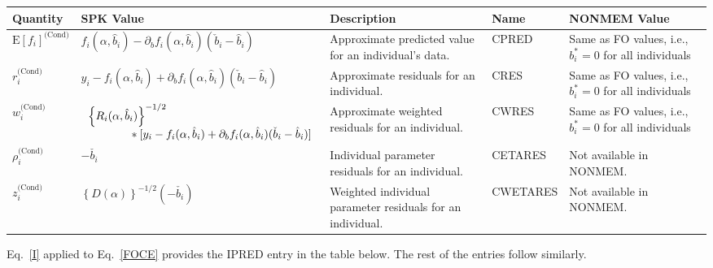 \documentclass{article}
\begin{document}
\begin{center}
\begin{tabular}{|p{0.75in}|p{3.25in}|p{1.1in}|p{0.85in}|p{1.0in}|}
\hline
\hline
  {\bf Quantity}
    & {\bf SPK Value}
    & {\bf Description}
    & {\bf Name}
    & {\bf NONMEM Value} \\
  \hline
  \hline
  $\mbox{E} \left[ f_i \right]^{\mbox{(Cond)}}$
    & $f_i(\alpha, \hat{b}_i) - \partial_b f_i(\alpha, \hat{b}_i)(\check{b}_i- \hat{b}_i)$
    & Approximate predicted value for an individual's data.
    & CPRED 
    & Same as FO values, i.e., $b^{\ast}_i = 0$ for all individuals\\
  \hline
  $r^{\mbox{(Cond)}}_i$
    & $y_i - f_i(\alpha, \hat{b}_i) + \partial_b f_i(\alpha, \hat{b}_i)(\check{b}_i- \hat{b}_i)$
    & Approximate residuals for an individual.
    & CRES 
    & Same as FO values, i.e., $b^{\ast}_i = 0$ for all individuals\\
  \hline
  $w^{\mbox{(Cond)}}_i$
    & $\begin{array}{l}
        \left\{ R_i(\alpha, \hat{b}_i) \right\}^{-1/2} \\
        \mbox{\hspace{0.5in}}
        \ast [ y_i - f_i(\alpha, \hat{b}_i) 
           + \partial_b f_i(\alpha, \hat{b}_i) (\check{b}_i- \hat{b}_i) ]
      \end{array} $
    & Approximate weighted residuals for an individual.
    & CWRES 
    & Same as FO values, i.e., $b^{\ast}_i = 0$ for all individuals\\
  \hline
  $\rho^{\mbox{(Cond)}}_i$
    & $-\check{b_i}$
    & Individual parameter residuals for an individual.
    & CETARES
    & Not available in NONMEM. \\
  \hline
  $z^{\mbox{(Cond)}}_i$
    & $\left\{ D(\alpha) \right\}^{-1/2} ( - \check{b_i} )$
    & Weighted individual parameter residuals for an individual.
    & CWETARES
    & Not available in NONMEM. \\
  \hline
  \hline
\end{tabular}
\end{center}

Eq.~\ref{I} applied to Eq.~\ref{FOCE} provides the IPRED entry in the table
below. The rest of the entries follow similarly.
\end{document}
